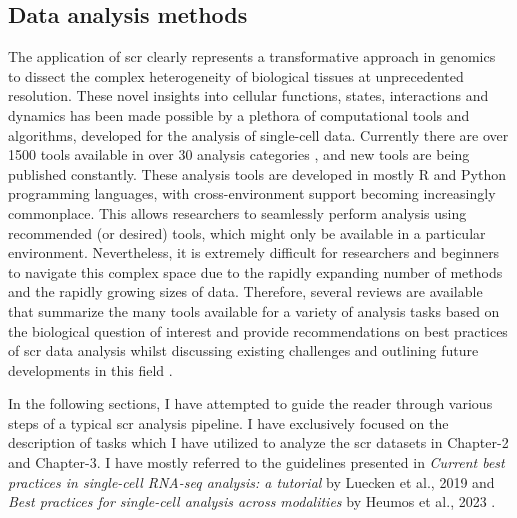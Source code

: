 \clearpage


\subsection{Data analysis methods}
\label{sec:scrna_analysis}
The application of \gls{scr} clearly represents a transformative approach in genomics to dissect the complex heterogeneity of biological tissues at unprecedented resolution. These novel insights into cellular functions, states, interactions and dynamics has been made possible by  a plethora of computational tools and algorithms, developed for the analysis of single-cell data. Currently there are over 1500 tools available in over 30 analysis categories \textbf{\cite{noauthor_scrna-tools_nodate}}, and new tools are being published constantly. These analysis tools are developed in mostly R and Python programming languages, with cross-environment support becoming increasingly commonplace. This allows researchers to seamlessly perform analysis using recommended (or desired) tools, which might only be available in a particular environment. Nevertheless, it is extremely difficult for researchers and beginners to navigate this complex space due to the rapidly expanding number of methods and the rapidly growing sizes of data. Therefore, several reviews are available that summarize the many tools available for a variety of analysis tasks based on the biological question of interest and provide recommendations on best practices of \gls{scr} data analysis whilst discussing existing challenges and outlining future developments in this field \textbf{\cite{zappia_exploring_2018,wu_tools_2020,balzer_how_2021,su_data_2022,ke_single_2022,lueckenmalte_d_current_2019,heumos_best_2023}}.

\vspace{0.2cm}

\begin{Abstract}
\vspace{3mm}
In the following sections, I have attempted to guide the reader through various steps of a typical \gls{scr} analysis pipeline. I have exclusively focused on the description of tasks which I have utilized to analyze the \gls{scr} datasets in Chapter-2 and Chapter-3. I have mostly referred to the guidelines presented in \textit{Current best practices in single-cell RNA-seq analysis: a tutorial} by Luecken et al., 2019 \textbf{\cite{lueckenmalte_d_current_2019}} and \textit{Best practices for single-cell analysis across modalities} by Heumos et al., 2023 \textbf{\cite{heumos_best_2023}}.
\vspace{3mm}
\end{Abstract}

